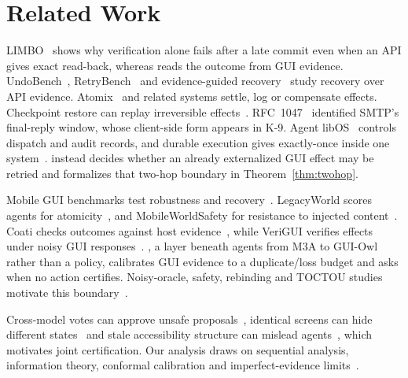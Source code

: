 \section{Related Work}
\label{sec:related}

LIMBO~\cite{li2026exactlyonce} shows why verification alone fails after a late commit even when an API gives exact read-back, whereas \sys reads the outcome from GUI evidence. UndoBench~\cite{sah2026undobench}, RetryBench~\cite{liu2026retrybench} and evidence-guided recovery~\cite{zhu2026evidence} study recovery over API evidence.
Atomix~\cite{mohammadi2026atomix} and related systems settle, log or compensate effects. Checkpoint restore can replay irreversible effects~\cite{khan2026resume,zheng2026acrfence,wu2026safe}. RFC~1047~\cite{rfc1047} identified SMTP's final-reply window, whose client-side form appears in K-9. Agent libOS~\cite{zhang2026agentlibos} controls dispatch and audit records, and durable execution gives exactly-once inside one system~\cite{temporal_docs,burckhardt2021durable,zhang2020beldi,jia2021boki}. \sys instead decides whether an already externalized GUI effect may be retried and formalizes that two-hop boundary in Theorem~\ref{thm:twohop}.

Mobile GUI benchmarks test robustness and recovery~\cite{rawles2025androidworld,chen2025dgara,bu2026recovering,zhang2026gracebench,hu2026cuarecovery,bang2026lostinrecovery,liu2026androidreality}. LegacyWorld scores agents for atomicity~\cite{reintjes2026legacyworld}, and MobileWorldSafety for resistance to injected content~\cite{chen2026mobileworldsafety}. Coati checks outcomes against host evidence~\cite{ying2026coati}, while VeriGUI verifies effects under noisy GUI responses~\cite{zhang2026verigui}. \sys, a layer beneath agents from M3A to GUI-Owl~\cite{ye2025mobileagentv3} rather than a policy, calibrates GUI evidence to a duplicate/loss budget and asks when no action certifies. Noisy-oracle, safety, rebinding and TOCTOU studies motivate this boundary~\cite{zheng2026tsr,yang2026taskvm,wu2025osoracle,sun2026vericua,lee2025verisafe,feng2026cora,qian2026rebinding,lilienthal2025toctou}.

Cross-model votes can approve unsafe proposals~\cite{zheng2026vpcontrol}, identical screens can hide different states~\cite{liu2026guinotstate} and stale accessibility structure can mislead agents~\cite{zhang2026believe}, which motivates joint certification. Our analysis draws on sequential analysis, information theory, conformal calibration and imperfect-evidence limits~\cite{morandi2026sequential,wald1945sprt,cover2006elements,vovk2005algorithmic,akkoyunlu1975constraints}.
